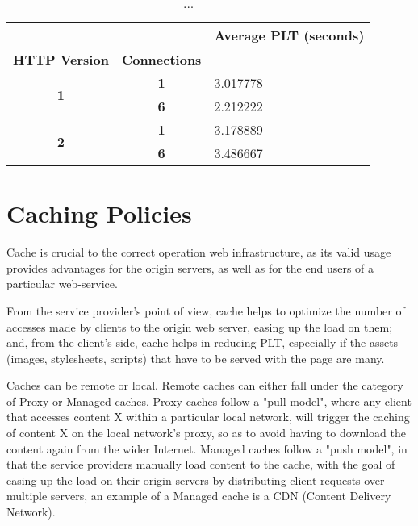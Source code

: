 \documentclass[a4paper,10pt]{article}
\begin{document}
\begin{table}[h!]
\centering
\begin{tabular}{|c|c|l|}
\hline
\multicolumn{1}{|r|}{\textbf{}} & \multicolumn{1}{l|}{} & \textbf{Average PLT (seconds)}         \\ \hline
\textbf{HTTP Version}          & \textbf{Connections}  & \multicolumn{1}{c|}{\textbf{}} \\ \hline
\multirow{2}{*}{\textbf{1}}     & \textbf{1}            & 3.017778                       \\ \cline{2-3} 
                                & \textbf{6}            & 2.212222                       \\ \hline
\multirow{2}{*}{\textbf{2}}     & \textbf{1}            & 3.178889                       \\ \cline{2-3} 
                                & \textbf{6}            & 3.486667                       \\ \hline
\end{tabular}
\caption{...}
\label{fig:table1}

\end{table}



\section{Caching Policies}

Cache is crucial to the correct operation web infrastructure, as its valid usage provides advantages for the origin servers, as well as for the end users of a particular web-service. 

From the service provider's point of view, cache helps to optimize the number of accesses made by clients to the origin web server, easing up the load on them; and, from the client's side, cache helps in reducing PLT, especially if the assets (images, stylesheets, scripts) that have to be served with the page are many.

Caches can be remote or local. Remote caches can either fall under the category of Proxy or Managed caches. Proxy caches follow a "pull model", where any client that accesses content X within a particular local network, will trigger the caching of content X on the local network's proxy, so as to avoid having to download the content again from the wider Internet. Managed caches follow a "push model", in that the service providers manually load content to the cache, with the goal of easing up the load on their origin servers by distributing client requests over multiple servers, an example of a Managed cache is a CDN (Content Delivery Network).
\end{document}
